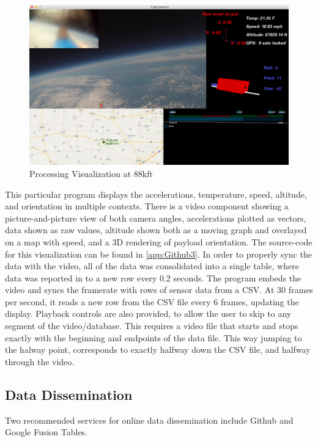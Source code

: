 \documentclass[heading.tex]{subfiles}
\begin{document}
\begin{figure}[hbtp]
\centering
\includegraphics[width=1\textwidth]{images/space.png}
 \caption{Processing Visualization at 88kft}
\label{f:processing}
\end{figure}

This particular program displays the accelerations, temperature, speed,
altitude, and orientation in multiple contexts. There is a video component
showing a picture-and-picture view of both camera angles, accelerations plotted
as vectors, data shown as raw values, altitude shown both as a moving graph and
overlayed on a map with speed, and a 3D rendering of payload orientation.
The source-code for this visualization can be found in \cref{app:Github3}.
In order to properly sync the data with the video, all of the data was consolidated
into a single table, where data was reported in to a new row every 0.2 seconds.
The program embeds the video and syncs the framerate with rows of sensor data
from a CSV. At 30 frames per second, it reads a new row from the CSV file every
6 frames, updating the display. Playback controls are also provided, to allow
the user to skip to any segment of the video/database. This requires a video
file that starts and stops exactly with the beginning and endpoints of the data
file. This way jumping to the halway point, corresponds to exactly halfway down
the CSV file, and halfway through the video.

\subsection{Data Dissemination}

Two recommended services for online data dissemination include Github and
Google Fusion Tables.
\end{document}
